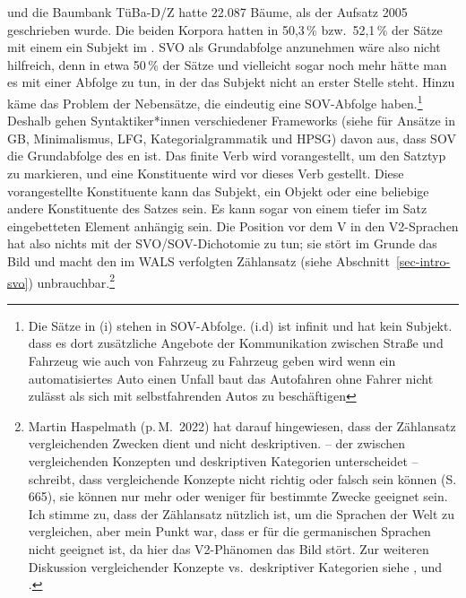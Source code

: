 und die Baumbank TüBa-D/Z hatte 22.087 Bäume, als der Aufsatz 2005 geschrieben wurde. Die beiden Korpora hatten
in 50,3\,\% bzw.\ 52,1\,\% der Sätze mit einem \vf ein Subjekt im \vf. 
SVO als Grundabfolge anzunehmen wäre also
nicht hilfreich, denn in etwa 50\,\% der Sätze und vielleicht sogar noch
mehr hätte man es mit einer Abfolge zu tun, in der das Subjekt nicht an erster Stelle steht. Hinzu
käme das Problem der Nebensätze, die eindeutig eine SOV-Abfolge
haben.\footnote{
Die Sätze in (i) stehen in SOV-Abfolge. (i.d) ist infinit und hat kein Subjekt.
\eal
\ex
dass es dort zusätzliche Angebote der Kommunikation zwischen Straße und Fahrzeug wie auch von Fahrzeug zu Fahrzeug geben wird
\ex
wenn ein automatisiertes Auto einen Unfall baut
\ex
das Autofahren ohne Fahrer nicht zulässt
\ex
als sich mit selbstfahrenden Autos zu beschäftigen
\zllast
}
Deshalb gehen Syntaktiker*innen verschiedener Frameworks (siehe \citealp{MuellerGT-Eng} für
Ansätze in GB, Minimalismus, LFG, Kategorialgrammatik und HPSG) davon aus, dass SOV die Grundabfolge des
en ist. Das finite Verb wird vorangestellt, um den Satztyp zu markieren, und eine Konstituente wird vor
dieses Verb gestellt. Diese vorangestellte Konstituente kann das Subjekt, ein Objekt oder eine beliebige andere Konstituente des
Satzes sein. Es kann sogar von einem tiefer im Satz eingebetteten Element anhängig sein. Die Position
vor dem V in den V2-Sprachen hat also nichts mit der SVO/SOV-Dichotomie zu tun; sie stört im Grunde
das Bild und macht den im WALS verfolgten Zählansatz (siehe Abschnitt~\ref{sec-intro-svo})
unbrauchbar.\footnote{
  Martin Haspelmath (p.\,M.\ 2022) hat darauf hingewiesen, dass der Zählansatz vergleichenden
  Zwecken dient und nicht deskriptiven. \citet{Haspelmath2010a} -- der zwischen vergleichenden Konzepten und deskriptiven
  Kategorien unterscheidet -- schreibt, dass vergleichende Konzepte nicht richtig oder falsch sein können (S.\,665), sie können nur mehr oder
  weniger für bestimmte Zwecke geeignet sein. Ich stimme zu, dass der Zählansatz nützlich ist, um die
  Sprachen der Welt zu vergleichen, aber mein Punkt war, dass er für die germanischen Sprachen nicht geeignet ist, da hier
  das V2-Phänomen das Bild stört. Zur weiteren Diskussion vergleichender Konzepte vs.\ deskriptiver Kategorien
  siehe ,  und .
}

